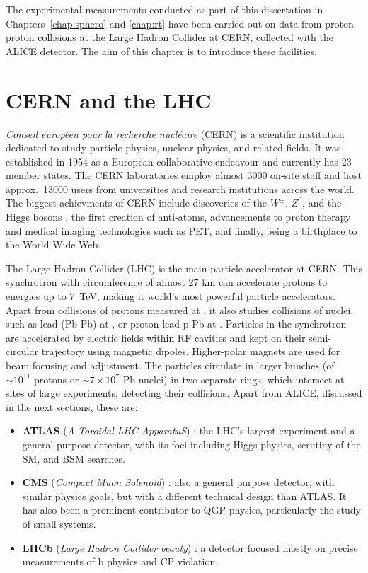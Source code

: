 \def \imgpath {"./figures/alice"}

The experimental measurements conducted as part of this dissertation in Chapters~\ref{chap:sphero} and \ref{chap:rt} have been carried out on data from proton-proton collisions at the Large Hadron Collider at CERN, collected with the ALICE detector. The aim of this chapter is to introduce these facilities.

\section{CERN and the LHC}

\textit{Conseil européen pour la recherche nucléaire} (CERN) is a scientific institution dedicated to study particle physics, nuclear physics, and related fields. It was established in 1954 as a European collaborative endeavour and currently has 23 member states. The CERN laboratories employ almost 3000 on-site staff and host approx.\ 13000 users from universities and research institutions across the world. The biggest achievments of CERN include discoveries of the $W^\pm$, $Z^0$, \cite{cashmorePrestigiousDiscoveriesCERN2003} and the Higgs bosons \cite{thecmscollaborationObservationNewBoson2012, theatlascollaborationObservationNewParticle2012}, the first creation of anti-atoms, advancements to proton therapy and medical imaging technologies such as PET, and finally, being a birthplace to the World Wide Web.

The Large Hadron Collider (LHC) is the main particle accelerator at CERN. This synchrotron with circumference of almost 27 km can accelerate protons to energies up to $7$~TeV, making it world's most powerful particle accelerators. Apart from collisions of protons measured at , it also studies collisions of nuclei, such as lead (Pb-Pb) at , or proton-lead p-Pb at . Particles in the synchrotron are accelerated by electric fields within RF cavities and kept on their semi-circular trajectory using magnetic dipoles. Higher-polar magnets are used for beam focusing and adjustment. The particles circulate in larger bunches (of $\sim 10^{11}$ protons or $\sim 7\times10^7$ Pb nuclei) in two separate rings, which intersect at sites of large experiments, detecting their collisions. Apart from ALICE, discussed in the next sections, these are:
\begin{itemize}
\item \textbf{ATLAS} (\textit{A Toroidal LHC ApparatuS}) \cite{collaborationATLASExperimentCERN2008}: the LHC's largest experiment and a general purpose detector, with its foci including Higgs physics, scrutiny of the SM, and BSM searches.
\item \textbf{CMS} (\textit{Compact Muon Solenoid}) \cite{collaborationCMSExperimentCERN2008}: also a general purpose detector, with similar physics goals, but with a different technical design than ATLAS. It has also been a prominent contributor to QGP physics, particularly the study of small systems.
\item \textbf{LHCb} (\textit{Large Hadron Collider beauty}) \cite{collaborationLHCbDetectorLHC2008}: a detector focused mostly on precise measurements of b physics and CP violation. 
\end{itemize}

